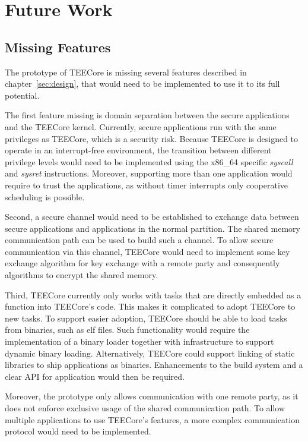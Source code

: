 \chapter{Future Work}
\label{sec:futurework}

\section{Missing Features}
The prototype of TEECore is missing several features described in
chapter~\ref{sec:design}, that would need to be implemented to use it to its
full potential.

The first feature missing is domain separation between the secure applications
and the TEECore kernel. Currently, secure applications run with the same
privileges as TEECore, which is a security risk. Because TEECore is designed to
operate in an interrupt-free environment, the transition between different
privilege levels would need to be implemented using the x86\_64 specific
\textit{syscall} and \textit{sysret} instructions. Moreover, supporting more
than one application would require to trust the applications, as without timer
interrupts only cooperative scheduling is possible.

Second, a secure channel would need to be established to exchange data between
secure applications and applications in the normal partition. The shared memory
communication path can be used to build such a channel. To allow secure
communication via this channel, TEECore would need to implement some key
exchange algorithm for key exchange with a remote party and consequently
algorithms to encrypt the shared memory.

Third, TEECore currently only works with tasks that are directly embedded as a
function into TEECore's code. This makes it complicated to adopt TEECore to new
tasks. To support easier adoption, TEECore should be able to load tasks from
binaries, such as \gls{elf} files. Such functionality would require the
implementation of a binary loader together with infrastructure to support
dynamic binary loading. Alternatively, TEECore could support linking of static
libraries to ship applications as binaries. Enhancements to the build system
and a clear API for application would then be required.

Moreover, the prototype only allows communication with one remote party, as it
does not enforce exclusive usage of the shared communication path. To allow
multiple applications to use TEECore's features, a more complex communication
protocol would need to be implemented.

